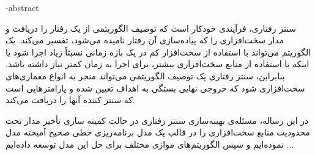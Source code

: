 \fa-abstract{\noindent
سنتز رفتاری، فرآیندی خودکار است که توصیف الگوریتمی از یک رفتار را دریافت و مدار سخت‌افزاری را که پیاده‌سازی آن رفتار نامیده می‌شود، تفسیر می‌کند. یک الگوریتم می‌تواند با استفاده از سخت‌افزار کم در یک بازه زمانی نسبتاً زیاد اجرا شود یا اینکه با استفاده از منابع سخت‌افزاری بیشتر، برای اجرا به زمان کمتر نیاز داشته باشد. بنابراین، سنتز رفتاری یک توصیف الگوریتمی می‌تواند منجر به انواع معماری‌های سخت‌افزاری شود که خروجی نهایی بستگی به اهداف تعیین شده و پارامترهایی است که سنتز کننده آنها را دریافت می‌کند. 

در این رساله، مسئله‌ی بهینه‌سازی سنتز رفتاری در حالت کمینه سازی تأخیر مدار تحت محدودیت منابع سخت‌افزاری را در قالب یک مدل برنامه‌ریزی خطی صحیح آمیخته مدل نموده‌ایم و سپس الگوریتم‌های موازی مختلف برای حل این مدل توسعه داده‌ایم ...

\\
}

\newpage